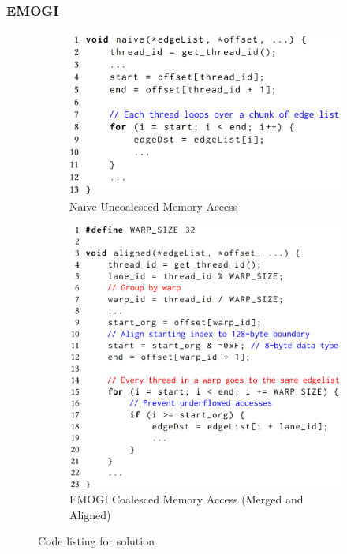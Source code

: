 \documentclass[xcolor=table,english]{beamer}
\begin{document}
\begin{frame}[fragile] \frametitle{EMOGI}
    \begin{minipage}[m]{1.0\linewidth}
        \begin{figure}
            \centering
            \begin{subfigure}[b]{0.44\textwidth}
                \includegraphics[width=\textwidth]{figures/emogi_naive.png}
                \caption{Na\"{\i}ve Uncoalesced Memory Access}
            \end{subfigure}
            \hfill
            \begin{subfigure}[b]{0.44\textwidth}
                \includegraphics[width=\textwidth]{figures/emogi.png}
                \caption{EMOGI Coalesced Memory Access (Merged and Aligned)}
            \end{subfigure}
            \caption{Code listing for solution}
        \end{figure}
    \end{minipage}\hfill
\end{frame}
\end{document}
